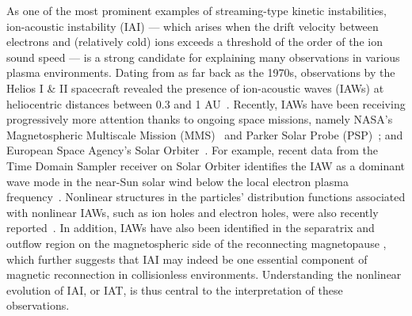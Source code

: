\documentclass[%
 reprint,
 amsmath,
 amssymb,
 aps,
 prx,
floatfix,
superscriptaddress
]{revtex4-2}
\begin{document}
As one of the most prominent examples of streaming-type kinetic instabilities, ion-acoustic instability (IAI) --- which arises when the drift velocity between electrons and (relatively cold) ions exceeds a threshold of the order of the ion sound speed --- is a strong candidate for explaining many observations in various plasma environments.
Dating from as far back as the 1970s, observations by the Helios I \& II spacecraft revealed the presence of ion-acoustic waves (IAWs) at heliocentric distances between 0.3 and 1 AU~\cite{gurnett1977plasma, gurnett1978ion}. 
Recently, IAWs have been receiving progressively more attention thanks to ongoing space missions, namely NASA's Magnetospheric Multiscale Mission (MMS)~\cite{Burch2016} and Parker Solar Probe (PSP)~\cite{fox2016solar}; and European Space Agency's Solar Orbiter~\cite{Muller2013}. 
For example, recent data from the Time Domain Sampler receiver on Solar Orbiter identifies the IAW as a dominant wave mode in the near-Sun solar wind below the local electron plasma frequency~\cite{2021pisa, graham2021kinetic}. 
Nonlinear structures in the particles' distribution functions associated with nonlinear IAWs, such as ion holes and electron holes, were also recently reported~\cite{Mozer2020a, Mozer2020b}. 
In addition, IAWs have also been identified in the separatrix and outflow region on the magnetospheric side of the reconnecting magnetopause \cite{uchino2017waves, steinvall2021large}, which further suggests that IAI may indeed be one essential component of magnetic reconnection in collisionless environments.
Understanding the nonlinear evolution of IAI, or IAT, is thus central to the interpretation of these observations. 
\end{document}
